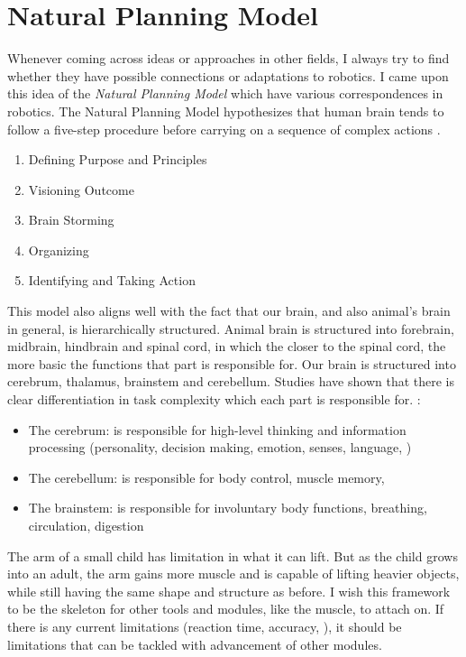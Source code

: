 \chapter{Natural Planning Model}
Whenever coming across ideas or approaches in other fields, I always try to find whether they have possible connections or adaptations to robotics. I came upon this idea of the \textit{Natural Planning Model} which have various correspondences in robotics. The Natural Planning Model hypothesizes that human brain tends to follow a five-step procedure before carrying on a sequence of complex actions \cite{allen2002getting}. 
\begin{enumerate}
	\item Defining Purpose and Principles
	\item Visioning Outcome 
	\item Brain Storming
	\item Organizing
	\item Identifying and Taking Action
\end{enumerate}

This model also aligns well with the fact that our brain, and also animal's brain in general, is hierarchically structured. Animal brain is structured into forebrain, midbrain, hindbrain and spinal cord, in which the closer to the spinal cord, the more basic the functions that part is responsible for. Our brain is structured into cerebrum, thalamus, brainstem and cerebellum. Studies have shown that there is clear differentiation in task complexity which each part is responsible for. \Eg:
\begin{itemize}
	\item The cerebrum: is responsible for high-level thinking and information processing (personality, decision making, emotion, senses, language, \etc)
	\item The cerebellum: is responsible for body control, muscle memory, \etc
	\item The brainstem: is responsible for involuntary body functions, \eg breathing, circulation, digestion
\end{itemize}

The arm of a small child has limitation in what it can lift. But as the child grows into an adult, the arm gains more muscle and is capable of lifting heavier objects, while still having the same shape and structure as before. I wish this framework to be the skeleton for other tools and modules, like the muscle, to attach on. If there is any current limitations (reaction time, accuracy, \etc), it should be limitations that can be tackled with advancement of other modules.

